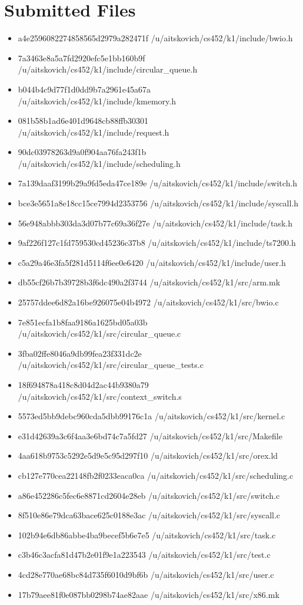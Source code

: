 \documentclass{article}
\begin{document}
\section{Submitted Files}
\begin{itemize}
  \item a4e2596082274858565d2979a282471f  /u/aitskovich/cs452/k1/include/bwio.h
  \item 7a3463e8a5a7fd2920efc5e1bb160b9f  /u/aitskovich/cs452/k1/include/circular\_queue.h
  \item b044b4c9d77f1d0dd9b7a2961e45a67a  /u/aitskovich/cs452/k1/include/kmemory.h
  \item 081b58b1ad6e401d9648cb88ffb30301  /u/aitskovich/cs452/k1/include/request.h
  \item 90dc03978263d9a0f904aa76fa243f1b  /u/aitskovich/cs452/k1/include/scheduling.h
  \item 7a139daaf3199b29a9fd5eda47ce189e  /u/aitskovich/cs452/k1/include/switch.h
  \item bce3e5651a8e18cc15ce7994d2353756  /u/aitskovich/cs452/k1/include/syscall.h
  \item 56e948abbb303da3d07b77c69a36f27e  /u/aitskovich/cs452/k1/include/task.h
  \item 9af226f127c1fd759530cd45236c37b8  /u/aitskovich/cs452/k1/include/ts7200.h
  \item c5a29a46e3fa5f281d5114f6ee0e6420  /u/aitskovich/cs452/k1/include/user.h
  \item db55cf26b7b39728b3f6dc490a2f3744  /u/aitskovich/cs452/k1/src/arm.mk
  \item 25757ddee6d82a16be926075e04b4972  /u/aitskovich/cs452/k1/src/bwio.c
  \item 7e851ecfa1b8faa9186a1625bd05a03b  /u/aitskovich/cs452/k1/src/circular\_queue.c
  \item 3fba02ffe8046a9db99fea23f331dc2e  /u/aitskovich/cs452/k1/src/circular\_queue\_tests.c
  \item 18f694878a418c8d04d2ac44b9380a79  /u/aitskovich/cs452/k1/src/context\_switch.s
  \item 5573ed5bb9debc960cda5dbb99176c1a  /u/aitskovich/cs452/k1/src/kernel.c
  \item e31d42639a3c6f4aa3e6bd74c7a5fd27  /u/aitskovich/cs452/k1/src/Makefile
  \item 4aa618b9753c5292e5d9e5c95d297f10  /u/aitskovich/cs452/k1/src/orex.ld
  \item cb127e770cea22148fb2f0233eaca0ca  /u/aitskovich/cs452/k1/src/scheduling.c
  \item a86e452286c5fec6e8871cd2604e28eb  /u/aitskovich/cs452/k1/src/switch.c
  \item 8f510e86e79dca63bace625c0188e3ac  /u/aitskovich/cs452/k1/src/syscall.c
  \item 102b94e6db86abbe4ba9becef5b6e7e5  /u/aitskovich/cs452/k1/src/task.c
  \item c3b46c3acfa81d47b2e01f9e1a223543  /u/aitskovich/cs452/k1/src/test.c
  \item 4cd28e770ae68bc84d735f6010d9bf6b  /u/aitskovich/cs452/k1/src/user.c
  \item 17b79aee81f0e087bb0298b74ae82aae  /u/aitskovich/cs452/k1/src/x86.mk
\end{itemize}
\end{document}
